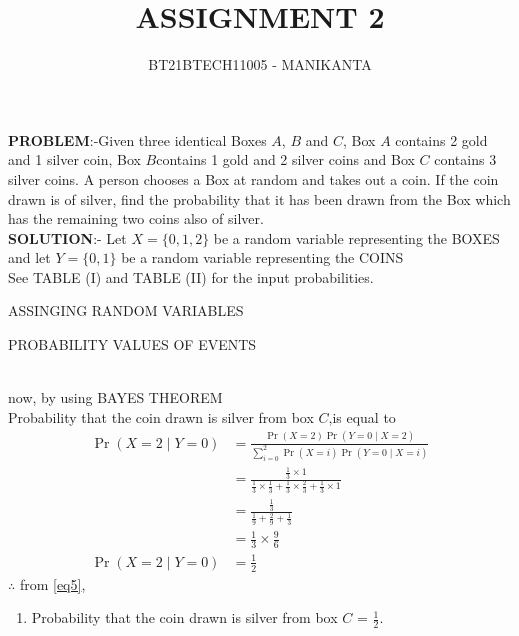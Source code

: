 \documentclass[journal,12pt,twocolumn]{IEEEtran}
\providecommand{\pr}[1]{\ensuremath{\Pr\left(#1\right)}}
\begin{document}
\vspace{3cm}
\title{ASSIGNMENT 2}
\author{BT21BTECH11005 - MANIKANTA}

\maketitle
\textbf{PROBLEM}:-Given three identical Boxes $A$, $B$ and $C$, Box $A$ contains 2 gold and 1 silver coin, Box $B $contains 1 gold and 2 silver coins and Box $C$ contains 3 silver coins. A person chooses a Box at random and takes out a coin. If the coin drawn is of silver, find the probability that it has been drawn from the Box which has the remaining two coins also of silver.\\

\textbf{SOLUTION}:-
Let $X=\{0,1,2\}$ be a random variable representing the BOXES and let $Y=\{0,1\}$ be a random variable representing the COINS \\

See TABLE (I) and TABLE (II) for the input probabilities.
\begin{table}[ht!]
\centering
 
\caption{ASSINGING RANDOM VARIABLES}
\label{Tables : TABLE}
\end{table}

 \begin{table}[ht!]
 
\caption{PROBABILITY VALUES OF EVENTS}
\label{Tables : TABLE}
\end{table}\\

now,
by using BAYES THEOREM\\
Probability that the coin drawn is silver from box $C$,is equal to
\begin{align}
\pr{X = 2 \mid Y = 0} &= \frac{\pr{X = 2}\pr{Y = 0 \mid X = 2}}{\sum_{i=0}^{2} \pr{X = i}\pr{Y=0 \mid X = i}}\label{eq1}\\
 &= \frac{\frac{1}{3} \times 1}{\frac{1}{3} \times \frac{1}{3}+\frac{1}{3} \times \frac{2}{3}+\frac{1}{3} \times 1
 }\label{eq2}\\
 &= \frac{\frac{1}{3}}{\frac{1}{9}+\frac{2}{9}+\frac{1}{3}}\label{eq3}\\
 &= \frac{1}{3} \times \frac{9}{6}\label{eq4}\\
 \pr{X = 2 \mid Y = 0} &= \frac{1}{2}\label{eq5}
\end{align}
$\therefore$ from \eqref{eq5},\\
\begin{enumerate}[label=]
\item Probability that the coin drawn is silver from box $C$ = $\frac{1}{2}$.
\end{enumerate}
\end{document}
